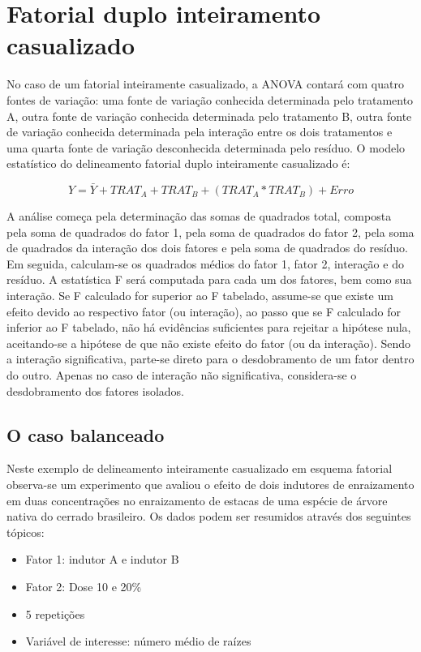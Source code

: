 \documentclass[
]{article}
\providecommand{\tightlist}{%
  \setlength{\itemsep}{0pt}\setlength{\parskip}{0pt}}
\begin{document}
\hypertarget{fatorial-duplo-inteiramento-casualizado}{%
\section{Fatorial duplo inteiramento casualizado}\label{fatorial-duplo-inteiramento-casualizado}}

No caso de um fatorial inteiramente casualizado, a ANOVA contará com quatro fontes de variação: uma fonte de variação conhecida determinada pelo tratamento A, outra fonte de variação conhecida determinada pelo tratamento B, outra fonte de variação conhecida determinada pela interação entre os dois tratamentos e uma quarta fonte de variação desconhecida determinada pelo resíduo. O modelo estatístico do delineamento fatorial duplo inteiramente casualizado é:

\[Y = \bar{Y} + TRAT_A + TRAT_B + (TRAT_A * TRAT_B) + Erro\]

A análise começa pela determinação das somas de quadrados total, composta pela soma de quadrados do fator 1, pela soma de quadrados do fator 2, pela soma de quadrados da interação dos dois fatores e pela soma de quadrados do resíduo. Em seguida, calculam-se os quadrados médios do fator 1, fator 2, interação e do resíduo. A estatística F será computada para cada um dos fatores, bem como sua interação. Se F calculado for superior ao F tabelado, assume-se que existe um efeito devido ao respectivo fator (ou interação), ao passo que se F calculado for inferior ao F tabelado, não há evidências suficientes para rejeitar a hipótese nula, aceitando-se a hipótese de que não existe efeito do fator (ou da interação). Sendo a interação significativa, parte-se direto para o desdobramento de um fator dentro do outro. Apenas no caso de interação não significativa, considera-se o desdobramento dos fatores isolados.

\hypertarget{o-caso-balanceado-2}{%
\subsection{O caso balanceado}\label{o-caso-balanceado-2}}

Neste exemplo de delineamento inteiramente casualizado em esquema fatorial observa-se um experimento que avaliou o efeito de dois indutores de enraizamento em duas concentrações no enraizamento de estacas de uma espécie de árvore nativa do cerrado brasileiro. Os dados podem ser resumidos através dos seguintes tópicos:

\begin{itemize}
\tightlist
\item
  Fator 1: indutor A e indutor B
\item
  Fator 2: Dose 10 e 20\%
\item
  5 repetições
\item
  Variável de interesse: número médio de raízes
\end{itemize}
\end{document}
